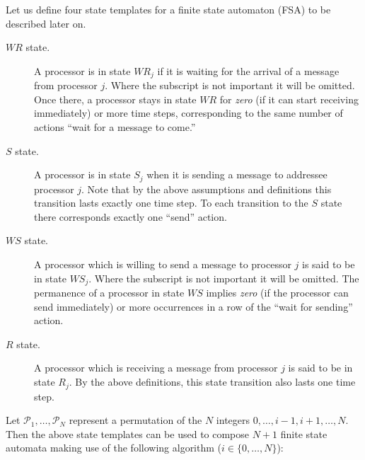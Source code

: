 \documentclass{elsart}
\begin{document}
\begin{defn}[states $W\!R, W\!S, S, R$]
Let us define four state templates for a finite state automaton 
(FSA) to be described later on.

\begin{description}
\item[$W\!R$ state.]
A processor is in state $W\!R_j$ if it is waiting for the arrival of a message
from processor $j$. Where the subscript is not important it will be omitted.
Once there, a processor stays in state $W\!R$ for \emph{zero\/} (if it can start
receiving immediately) or more time steps, corresponding to the same number
of actions ``wait for a message to come.''


\item[$S$ state.]
A processor is in state $S_j$ when it is sending a message to addressee processor $j$.
Note that by the above assumptions and definitions this transition lasts exactly one time step.
To each transition to the $S$ state there corresponds exactly one ``send'' action.

\item[$W\!S$ state.]
A processor which is willing to send a message to processor $j$ is said to be in
state $W\!S_j$. Where the subscript is not important it will be omitted.
The permanence of a processor in state $W\!S$ implies \emph{zero\/} (if
the processor can send immediately) or more occurrences in a row of
the ``wait for sending'' action.


\item[$R$ state.]
A processor which is receiving a message from processor $j$ is said to be in
state $R_j$. By the above definitions, this state transition also lasts 
one time step.
\end{description}
\end{defn}

Let
${\mathcal P}_1,\dots,{\mathcal P}_N$ represent a permutation of the 
$N$ integers $0,\dots,i-1,i+1,\dots,N$. 
Then the above state templates can be used to compose $N+1$
finite state automata making use of the following
algorithm ($i\in\{0,\dots,N\}$):
\end{document}
